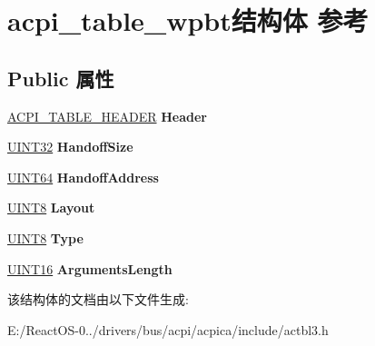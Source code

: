 \hypertarget{structacpi__table__wpbt}{}\section{acpi\+\_\+table\+\_\+wpbt结构体 参考}
\label{structacpi__table__wpbt}
\subsection*{Public 属性}
\begin{DoxyCompactItemize}
\item 
\mbox{\label{structacpi__table__wpbt_ac79f42568d7fe9ee6ae5692f7f882f8a}} 
\hyperlink{structacpi__table__header}{A\+C\+P\+I\+\_\+\+T\+A\+B\+L\+E\+\_\+\+H\+E\+A\+D\+ER} {\bfseries Header}
\item 
\mbox{\label{structacpi__table__wpbt_aa97edc86d170440c1d9b54844073ad72}} 
\hyperlink{_processor_bind_8h_ae1e6edbbc26d6fbc71a90190d0266018}{U\+I\+N\+T32} {\bfseries Handoff\+Size}
\item 
\mbox{\label{structacpi__table__wpbt_ae8bfb6eafc0c0fb62a44b6cb321cdc20}} 
\hyperlink{_processor_bind_8h_a57be03562867144161c1bfee95ca8f7c}{U\+I\+N\+T64} {\bfseries Handoff\+Address}
\item 
\mbox{\label{structacpi__table__wpbt_a16766c34bddd46993220623a8999d9ce}} 
\hyperlink{_processor_bind_8h_ab27e9918b538ce9d8ca692479b375b6a}{U\+I\+N\+T8} {\bfseries Layout}
\item 
\mbox{\label{structacpi__table__wpbt_a6c17c990bb955f9eb42768f130d0c40c}} 
\hyperlink{_processor_bind_8h_ab27e9918b538ce9d8ca692479b375b6a}{U\+I\+N\+T8} {\bfseries Type}
\item 
\mbox{\label{structacpi__table__wpbt_a710504f9bb1713544c3aa2116c3b6b8e}} 
\hyperlink{_processor_bind_8h_a09f1a1fb2293e33483cc8d44aefb1eb1}{U\+I\+N\+T16} {\bfseries Arguments\+Length}
\end{DoxyCompactItemize}


该结构体的文档由以下文件生成\+:\begin{DoxyCompactItemize}
\item 
E\+:/\+React\+O\+S-\/0../drivers/bus/acpi/acpica/include/actbl3.\+h\end{DoxyCompactItemize}
